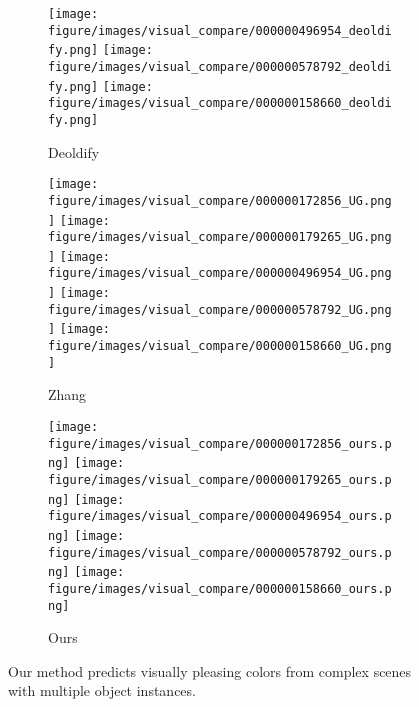 {\begin{figure*}[!t]
\begin{subfigure}[t]{.16\linewidth}
       \texttt{[image: figure/images/visual\_compare/000000496954\_deoldify.png]}
       \texttt{[image: figure/images/visual\_compare/000000578792\_deoldify.png]}
       \texttt{[image: figure/images/visual\_compare/000000158660\_deoldify.png]}
       \caption{Deoldify~\cite{Deoldify}}
    \end{subfigure}
    \hfill
    \begin{subfigure}[t]{.16\linewidth}
       \texttt{[image: figure/images/visual\_compare/000000172856\_UG.png]}
       \texttt{[image: figure/images/visual\_compare/000000179265\_UG.png]}
       \texttt{[image: figure/images/visual\_compare/000000496954\_UG.png]}
       \texttt{[image: figure/images/visual\_compare/000000578792\_UG.png]}
       \texttt{[image: figure/images/visual\_compare/000000158660\_UG.png]}
       \caption{Zhang~\etal~\cite{Zhang-SIGGRAPH-2017}}
    \end{subfigure}
    \hfill
    \begin{subfigure}[t]{.16\linewidth}
       \texttt{[image: figure/images/visual\_compare/000000172856\_ours.png]}
       \texttt{[image: figure/images/visual\_compare/000000179265\_ours.png]}
       \texttt{[image: figure/images/visual\_compare/000000496954\_ours.png]}
       \texttt{[image: figure/images/visual\_compare/000000578792\_ours.png]}
       \texttt{[image: figure/images/visual\_compare/000000158660\_ours.png]}
       \caption{Ours}
    \end{subfigure}
    \caption{ Our method predicts visually pleasing colors from complex scenes with multiple object instances.}
    \label{fig:comparison}
\end{figure*} 

}
